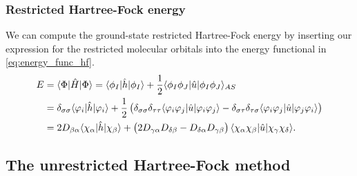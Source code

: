             \subsubsection{Restricted Hartree-Fock energy}
                We can compute the ground-state restricted Hartree-Fock energy
                by inserting our expression for the restricted molecular
                orbitals into the energy functional in
                \autoref{eq:energy_func_hf}.
                \begin{align}
                    E
                    &= \langle \Phi |\hat{H}| \Phi \rangle
                    = \langle \phi_I |\hat{h}| \phi_I \rangle
                    + \frac{1}{2}
                    \langle \phi_I\phi_J |
                    \hat{u}
                    | \phi_I\phi_J \rangle_{AS}
                    \\
                    &=
                    \delta_{\sigma\sigma}
                    \langle \varphi_i |\hat{h}| \varphi_i \rangle
                    + \frac{1}{2}\left( 
                        \delta_{\sigma\sigma}\delta_{\tau\tau}
                        \langle \varphi_i\varphi_j |
                        \hat{u}
                        | \varphi_i\varphi_j \rangle
                        - \delta_{\sigma\tau}\delta_{\tau\sigma}
                        \langle \varphi_i\varphi_j |
                        \hat{u}
                        | \varphi_j\varphi_i \rangle
                     \right)
                    \\
                    &=
                    2
                    D_{\beta \alpha}
                    \langle \chi_{\alpha} |\hat{h}| \chi_{\beta} \rangle
                    + \left( 
                        2
                        D_{\gamma\alpha} D_{\delta\beta}
                        -
                        D_{\delta\alpha}
                        D_{\gamma\beta}
                     \right)
                    \langle \chi_{\alpha}\chi_{\beta} |
                    \hat{u}
                    | \chi_{\gamma}\chi_{\delta} \rangle.
                \end{align}

        \subsection{The unrestricted Hartree-Fock method}




